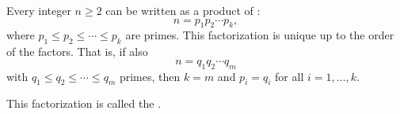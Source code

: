 \begin{theorem} \label{theorem:fundamental_theorem_of_arithmetic}
    Every integer $n \geq 2$ can be written as a product of :
    $$n = p_1 p_2 \cdots p_k,$$
    where $p_1 \leq p_2 \leq \cdots \leq p_k$ are primes. This factorization is unique up to the order of the factors. That is, if also
    $$n = q_1 q_2 \cdots q_m$$
    with $q_1 \leq q_2 \leq \cdots \leq q_m$ primes, then $k = m$ and $p_i = q_i$ for all $i = 1, \dots, k$.

    This factorization is called the .
\end{theorem}
